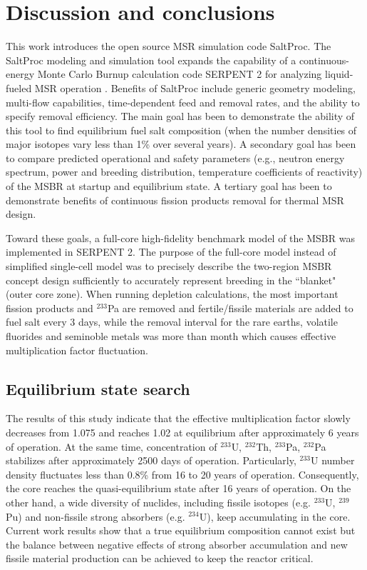 \section{Discussion and conclusions}

This work introduces the open source \gls{MSR} simulation code SaltProc. The 
SaltProc modeling and simulation tool expands the capability of a 
continuous-energy Monte Carlo Burnup calculation code SERPENT 2 for analyzing 
liquid-fueled \gls{MSR} operation 
\cite{andrei_rykhlevskii_arfc/saltproc:_2018}. Benefits of SaltProc include 
generic geometry modeling, multi-flow capabilities, time-dependent feed and 
removal rates, and the ability to specify removal efficiency. The main goal has 
been to demonstrate the ability of this tool to find equilibrium fuel salt 
composition (when the number densities of major isotopes vary less than 1\% 
over several years). A secondary goal has been to compare predicted operational 
and safety parameters (e.g., neutron energy spectrum, power and breeding 
distribution, temperature coefficients of reactivity) of the \gls{MSBR} at 
startup and equilibrium state. A tertiary goal has been to demonstrate benefits 
of continuous fission products removal for thermal \gls{MSR} design.

Toward these goals, a full-core high-fidelity benchmark model of the \gls{MSBR} 
was implemented in SERPENT 2. The purpose of the full-core model instead of 
simplified single-cell model \cite{betzler_molten_2017, 
rykhlevskii_online_2017, betzler_fuel_2018} was to precisely describe the 
two-region \gls{MSBR} concept design sufficiently to accurately represent 
breeding in the ``blanket" (outer core zone). When running depletion 
calculations, the most important fission products and $^{233}$Pa are removed 
and fertile/fissile materials are added to fuel salt every 3 days, while the 
removal interval for the rare earths, volatile fluorides and seminoble metals 
was more than month which causes effective multiplication factor fluctuation. 

\subsection{Equilibrium state search}
The results of this study indicate that the effective multiplication factor 
slowly decreases from 1.075 and reaches 1.02 at equilibrium after approximately 
6 years of operation. At the same time, concentration of $^{233}$U, $^{232}$Th, 
$^{233}$Pa, $^{232}$Pa stabilizes after approximately 2500 days of operation. 
Particularly, $^{233}$U number density fluctuates less than 0.8\% from 16 to 20 
years of operation. Consequently, the core reaches the quasi-equilibrium state 
after 16 years of operation. On the other hand, a wide diversity of nuclides, 
including fissile isotopes (e.g. $^{233}$U, $^{239}$Pu) and non-fissile strong 
absorbers (e.g. $^{234}$U), keep accumulating in the core. Current work results 
show that a true equilibrium composition cannot exist but the balance between 
negative effects of strong absorber accumulation and new fissile material 
production can be achieved to keep the reactor critical.

